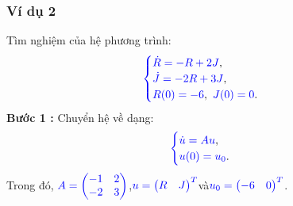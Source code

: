 \documentclass[a4paper]{article}
\begin{document}
\subsubsection{Ví dụ 2}
Tìm nghiệm của hệ phương trình:
\begin{align}
	    \textcolor{blue}{
	    \begin{cases}
            \dot R = -R + 2J \textcolor{black}{,}\\
            \dot J = -2R + 3J \textcolor{black}{,}\\
            R(0) = -6\textcolor{black}{,} \enskip J(0) = 0 \textcolor{black}{.}
        \end{cases}
        }
        \notag
	\end{align}
{\bfseries Bước 1 :} Chuyển hệ về dạng:
\begin{align}
	    \textcolor{blue}{
	    \begin{cases}
            \dot u = Au \textcolor{black}{,}\\
            u(0) = u\sb{0}\textcolor{black}{.}
        \end{cases}
        }
       \notag
	\end{align}
Trong đó,  $\textcolor{blue}{A = \begin{pmatrix} -1 & 2\\ -2 & 3 \end{pmatrix}}$,\enskip $\textcolor{blue}{u = \begin{pmatrix} R & J \end{pmatrix}\sp{T}}$\enskip và\enskip $\textcolor{blue}{u\sb{0} = \begin{pmatrix} -6 & 0 \end{pmatrix}\sp{T}}$.\\\\
\end{document}
